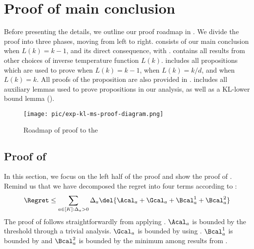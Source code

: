 \newpage
\appendix

\section{Proof of main conclusion} \label{sec:main-theorem}

Before presenting the details, we outline our proof roadmap in . We divide the proof into three phases, moving from left to right. 
 consists of our main conclusion when $L(k) = k - 1$,  and its direct consequence,  with .
 contains all results from other choices of inverse temperature function $L(k)$.
 includes all propositions which are used to prove  when $L(k) = k - 1$,  when $L(k) = k/d$, and  when $L(k) = k$. All proofs of the proposition are also provided in .
 includes all auxiliary lemmas used to prove propositions in our analysis, as well as a KL-lower bound lemma ().

\begin{figure}[H]
    \centering
    \texttt{[image: pic/exp-kl-ms-proof-diagram.png]}
    \caption{Roadmap of proof to the }
    \label{fig:proof-flow}
\end{figure}

\subsection{Proof of }
In this section,  we focus on the left half of the proof and show the proof of .
Remind us that we have decomposed the regret into four terms according to :
\[
    \Regret \leq \sum_{a\in[K]:\Delta_a > 0} \Delta_a \del{\Acal_a + \Gcal_a + \Bcal_a^1 + \Bcal_a^2}
\]
The proof of  follows straightforwardly from applying .
$\Acal_a$ is bounded by the threshold through a trivial analysis. $\Gcal_a$ is bounded by using . $\Bcal^1_a$ is bounded by  and $\Bcal^2_a$ is bounded by the minimum among results from .

